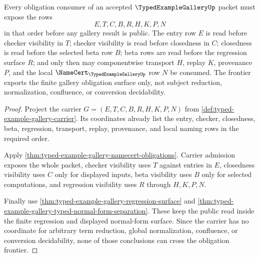 \begin{theorem}
\label{thm:typed-example-gallery-obligation-frontier}
Every obligation consumer of an accepted $\TypedExampleGalleryUp$ packet must expose the rows
$$
E,T,C,B,R,H,K,P,N
$$
in that order before any gallery result is public. The entry row $E$ is read before checker visibility in $T$; checker visibility is read before closedness in $C$; closedness is read before the selected beta row $B$; beta rows are read before the regression surface $R$; and only then may componentwise transport $H$, replay $K$, provenance $P$, and the local $\NameCert_{\TypedExampleGalleryUp}$ row $N$ be consumed. The frontier exports the finite gallery obligation surface only, not subject reduction, normalization, confluence, or conversion decidability.
\end{theorem}
\begin{proof}
Project the carrier $G=(E,T,C,B,R,H,K,P,N)$ from \autoref{def:typed-example-gallery-carrier}. Its coordinates already list the entry, checker, closedness, beta, regression, transport, replay, provenance, and local naming rows in the required order.

Apply \autoref{thm:typed-example-gallery-namecert-obligations}. Carrier admission exposes the whole packet, checker visibility uses $T$ against entries in $E$, closedness visibility uses $C$ only for displayed inputs, beta visibility uses $B$ only for selected computations, and regression visibility uses $R$ through $H,K,P,N$.

Finally use \autoref{thm:typed-example-gallery-regression-surface} and \autoref{thm:typed-example-gallery-typed-normal-form-separation}. These keep the public read inside the finite regression and displayed normal-form surface. Since the carrier has no coordinate for arbitrary term reduction, global normalization, confluence, or conversion decidability, none of those conclusions can cross the obligation frontier.
\end{proof}

